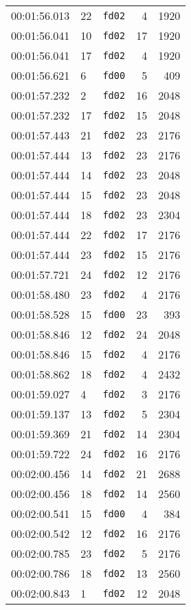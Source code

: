 \documentclass{article}
\begin{document}
\begin{longtable}{lllrr}
00:01:56.013 & 22 & \texttt{fd02} & 4 & 1920 \\
00:01:56.041 & 10 & \texttt{fd02} & 17 & 1920 \\
00:01:56.041 & 17 & \texttt{fd02} & 4 & 1920 \\
00:01:56.621 & 6 & \texttt{fd00} & 5 & 409 \\
00:01:57.232 & 2 & \texttt{fd02} & 16 & 2048 \\
00:01:57.232 & 17 & \texttt{fd02} & 15 & 2048 \\
00:01:57.443 & 21 & \texttt{fd02} & 23 & 2176 \\
00:01:57.444 & 13 & \texttt{fd02} & 23 & 2176 \\
00:01:57.444 & 14 & \texttt{fd02} & 23 & 2048 \\
00:01:57.444 & 15 & \texttt{fd02} & 23 & 2048 \\
00:01:57.444 & 18 & \texttt{fd02} & 23 & 2304 \\
00:01:57.444 & 22 & \texttt{fd02} & 17 & 2176 \\
00:01:57.444 & 23 & \texttt{fd02} & 15 & 2176 \\
00:01:57.721 & 24 & \texttt{fd02} & 12 & 2176 \\
00:01:58.480 & 23 & \texttt{fd02} & 4 & 2176 \\
00:01:58.528 & 15 & \texttt{fd00} & 23 & 393 \\
00:01:58.846 & 12 & \texttt{fd02} & 24 & 2048 \\
00:01:58.846 & 15 & \texttt{fd02} & 4 & 2176 \\
00:01:58.862 & 18 & \texttt{fd02} & 4 & 2432 \\
00:01:59.027 & 4 & \texttt{fd02} & 3 & 2176 \\
00:01:59.137 & 13 & \texttt{fd02} & 5 & 2304 \\
00:01:59.369 & 21 & \texttt{fd02} & 14 & 2304 \\
00:01:59.722 & 24 & \texttt{fd02} & 16 & 2176 \\
00:02:00.456 & 14 & \texttt{fd02} & 21 & 2688 \\
00:02:00.456 & 18 & \texttt{fd02} & 14 & 2560 \\
00:02:00.541 & 15 & \texttt{fd00} & 4 & 384 \\
00:02:00.542 & 12 & \texttt{fd02} & 16 & 2176 \\
00:02:00.785 & 23 & \texttt{fd02} & 5 & 2176 \\
00:02:00.786 & 18 & \texttt{fd02} & 13 & 2560 \\
00:02:00.843 & 1 & \texttt{fd02} & 12 & 2048 \\

\end{longtable}
\end{document}
